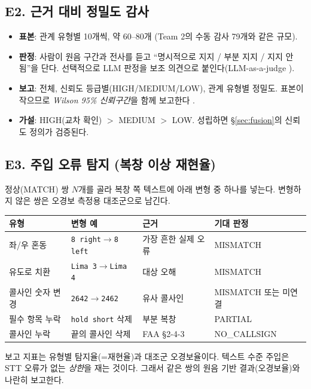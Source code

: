 \documentclass[10pt,a4paper]{article}
\newcommand{\cmd}[1]{\textsf{\small #1}}
\begin{document}
\subsection*{E2. 근거 대비 정밀도 감사}
\begin{itemize}
\item \textbf{표본}: 관계 유형별 10개씩, 약 60--80개 (Team 2의 수동 감사 79개와 같은 규모).
\item \textbf{판정}: 사람이 원음 구간과 전사를 듣고 ``명시적으로 지지 / 부분 지지 / 지지 안 됨''을 단다. 선택적으로 LLM 판정을 보조 의견으로 붙인다(LLM-as-a-judge \cite{zheng2023judge}).
\item \textbf{보고}: 전체, 신뢰도 등급별(HIGH/MEDIUM/LOW), 관계 유형별 정밀도. 표본이 작으므로 \emph{Wilson 95\% 신뢰구간}을 함께 보고한다 \cite{wilson1927}.
\item \textbf{가설}: HIGH(교차 확인) $>$ MEDIUM $>$ LOW. 성립하면 \S\ref{sec:fusion}의 신뢰도 정의가 검증된다.
\end{itemize}

\subsection*{E3. 주입 오류 탐지 (복창 이상 재현율)}
정상(\cmd{MATCH}) 쌍 $N$개를 골라 복창 쪽 텍스트에 아래 변형 중 하나를 넣는다. 변형하지 않은 쌍은 오경보 측정용 대조군으로 남긴다.
\begin{center}\small
\begin{tabularx}{\textwidth}{@{}l>{\raggedright\arraybackslash}X l l@{}}
\toprule
유형 & 변형 예 & 근거 & 기대 판정\\\midrule
좌/우 혼동 & \texttt{8 right}$\to$\texttt{8 left} & 가장 흔한 실제 오류 \cite{cardosi94} & \cmd{MISMATCH}\\
유도로 치환 & \texttt{Lima 3}$\to$\texttt{Lima 4} & 대상 오해 & \cmd{MISMATCH}\\
콜사인 숫자 변경 & \texttt{2642}$\to$\texttt{2462} & 유사 콜사인 \cite{eurocontrol} & \cmd{MISMATCH} 또는 미연결\\
필수 항목 누락 & \texttt{hold short} 삭제 & 부분 복창 & \cmd{PARTIAL}\\
콜사인 누락 & 끝의 콜사인 삭제 & FAA §2-4-3 \cite{faa7110} & \cmd{NO\_CALLSIGN}\\
\bottomrule
\end{tabularx}
\end{center}
보고 지표는 유형별 탐지율(=재현율)과 대조군 오경보율이다. 텍스트 수준 주입은 STT 오류가 없는 \emph{상한}을 재는 것이다. 그래서 같은 쌍의 원음 기반 결과(오경보율)와 나란히 보고한다.
\end{document}
